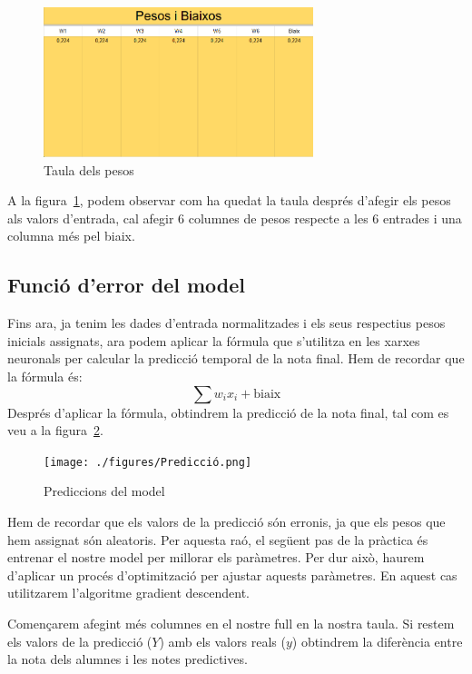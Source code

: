 \begin{figure}[h!]
    \centering
    \includegraphics[width=0.7\textwidth]{./figures/Pesos.png}
    \caption{Taula dels pesos}
    \label{f:pesos}
\end{figure}

A la figura~\ref{f:pesos}, podem observar com ha quedat la taula després d'afegir els pesos als valors d'entrada, cal afegir 6 columnes de pesos respecte a les 6 entrades i una columna més pel biaix.

\subsection{Funció d'error del model}
Fins ara, ja tenim les dades d'entrada normalitzades i els seus respectius pesos inicials assignats, ara podem aplicar la fórmula que s'utilitza en les xarxes neuronals per calcular la predicció temporal de la nota final. Hem de recordar que la fórmula és:
$$\sum w_i x_i + \text{biaix}$$
Després d'aplicar la fórmula, obtindrem la predicció de la nota final, tal com es veu a la figura~\ref{f:prediccio}.

\begin{figure}[h!]
    \centering
    \texttt{[image: ./figures/Predicció.png]}
    \caption{Prediccions del model}
    \label{f:prediccio}
 \end{figure}

Hem de recordar que els valors de la predicció són erronis, ja que els pesos que hem assignat són aleatoris. Per aquesta raó, el següent pas de la pràctica és entrenar el nostre model per millorar els paràmetres. Per dur això, haurem d'aplicar un procés d'optimització per ajustar aquests paràmetres. En aquest cas utilitzarem l'algoritme gradient descendent.

Començarem afegint més columnes en el nostre full en la nostra taula. Si restem els valors de la predicció ($Y$) amb els valors reals ($y$) obtindrem la diferència entre la nota dels alumnes i les notes predictives.

